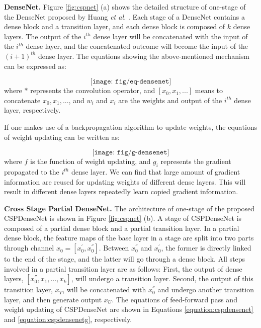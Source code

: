 \documentclass{article}
\begin{document}
{\bf DenseNet.} Figure \ref{fig:cspnet} (a) shows the detailed structure of one-stage of the DenseNet proposed by Huang \textit{et al.} \cite{huang2017densely}.  Each stage of a DenseNet contains a dense block and a transition layer, and each dense block is composed of $k$ dense layers.  The output of the $i^{th}$ dense layer will be concatenated with the input of the $i^{th}$ dense layer, and the concatenated outcome will become the input of the $(i+1)^{th}$ dense layer.  The equations showing the above-mentioned mechanism can be expressed as:

\begin{equation}
\label{equation:densenet}
\texttt{[image: fig/eq-densenet]}
\end{equation}
where $*$ represents the convolution operator, and $[x_{0},x_{1},...]$ means to concatenate $x_{0},x_{1},...$, and $w_{i}$ and $x_{i}$ are the weights and output of the  $i^{th}$ dense layer, respectively.

If one makes use of a backpropagation algorithm to update weights, the equations of weight updating can be written as:

\begin{equation}
\label{equation:densenetg}
\texttt{[image: fig/g-densenet]}
\end{equation}
where $f$ is the function of weight updating, and $g_{i}$ represents the gradient propagated to the $i^{th}$ dense layer.  We can find that large amount of gradient information are reused for updating weights of different dense layers.  This will result in different dense layers repeatedly learn copied gradient information.

{\bf Cross Stage Partial DenseNet.} The architecture of one-stage of the proposed CSPDenseNet is shown in Figure \ref{fig:cspnet} (b).  A stage of CSPDenseNet is composed of a partial dense block and a partial transition layer.  In a partial dense block, the feature maps of the base layer in a stage are split into two parts through channel $x_{0}=[x_{0}^{'}, x_{0}^{''}]$.  Between $x_{0}^{''}$ and $x_{0}^{'}$, the former is directly linked to the end of the stage, and the latter will go through a dense block.  All steps involved in a partial transition layer are as follows: First, the output of dense layers, $[x_{0}^{''}, x_{1}, ..., x_{k}]$, will undergo a transition layer.  Second, the output of this transition layer, $x_{T}$, will be concatenated with $x_{0}^{''}$ and undergo another transition layer, and then generate output $x_{U}$.  The equations of feed-forward pass and weight updating of CSPDenseNet are shown in Equations \ref{equation:cspdensenet} and \ref{equation:cspdensenetg}, respectively.
\end{document}
